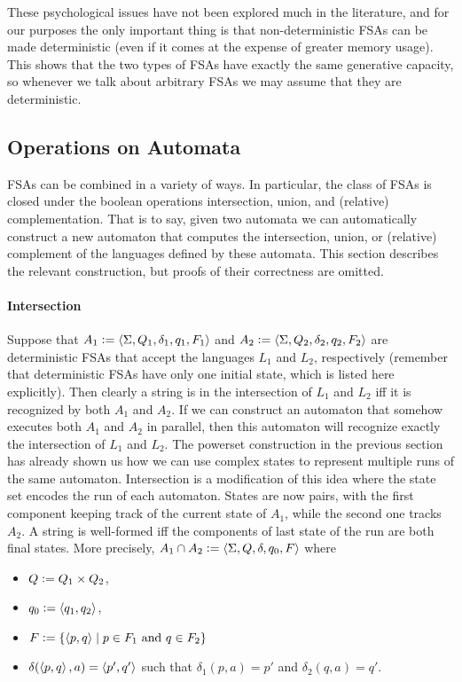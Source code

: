 These psychological issues have not been explored much in the literature, and for our purposes the only important thing is that non-deterministic FSAs can be made deterministic (even if it comes at the expense of greater memory usage).
This shows that the two types of FSAs have exactly the same generative capacity, so whenever we talk about arbitrary FSAs we may assume that they are deterministic.

\subsection{Operations on Automata}
\label{sub:REG_AutomataOperations}

FSAs can be combined in a variety of ways.
In particular, the class of FSAs is closed under the boolean operations intersection, union, and (relative) complementation.
That is to say, given two automata we can automatically construct a new automaton that computes the intersection, union, or (relative) complement of the languages defined by these automata.
This section describes the relevant construction, but proofs of their correctness are omitted.
%
\paragraph{Intersection}
Suppose that $A_1 \mathrel{\mathop:}= \left \langle \Sigma,Q_1,\delta_1,q_1,F_1 \right \rangle $ and $A_2 \mathrel{\mathop:}= \left \langle \Sigma,Q_2,\delta_2,q_2,F_2 \right \rangle $ are deterministic FSAs that accept the languages $L_1$ and $L_2$, respectively (remember that deterministic FSAs have only one initial state, which is listed here explicitly).
Then clearly a string is in the intersection of $L_1$ and $L_2$ iff it is recognized by both $A_1$ and $A_2$.
If we can construct an automaton that somehow executes both $A_1$ and $A_2$ in parallel, then this automaton will recognize exactly the intersection of $L_1$ and $L_2$.
The powerset construction in the previous section has already shown us how we can use complex states to represent multiple runs of the same automaton.
Intersection is a modification of this idea where the state set encodes the run of each automaton.
States are now pairs, with the first component keeping track of the current state of $A_1$, while the second one tracks $A_2$.
A string is well-formed iff the components of last state of the run are both final states.
More precisely, $A_1 \cap A_2 \mathrel{\mathop:}= \left \langle \Sigma,Q,\delta,q_0,F \right \rangle $ where
%
\begin{itemize}
    \item $Q \mathrel{\mathop:}= Q_1 \times Q_2$,
    \item $q_0 \mathrel{\mathop:}= \left \langle q_1,q_2 \right \rangle $,
    \item $F \mathrel{\mathop:}= \left \{ \left \langle p,q \right \rangle  \mid p \in F_1 \text{ and } q \in F_2 \right \}$
    \item $\delta(\left \langle p,q \right \rangle ,a) = \left \langle p',q' \right \rangle $ such that $\delta_1(p,a) = p'$ and $\delta_2(q,a) = q'$.
\end{itemize}

